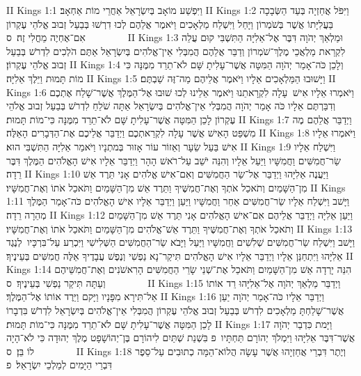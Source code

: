 II Kings 1:1	וַיִּפְשַׁע מוֹאָב בְּיִשְׂרָאֵל אַחֲרֵי מוֹת אַחְאָב׃
II Kings 1:2	וַיִּפֹּל אֲחַזְיָה בְּעַד הַשְּׂבָכָה בַּעֲלִיָּתוֹ אֲשֶׁר בְּשֹׁמְרוֹן וַיָּחַל וַיִּשְׁלַח מַלְאָכִים וַיֹּאמֶר אֲלֵהֶם לְכוּ דִרְשׁוּ בְּבַעַל זְבוּב אֱלֹהֵי עֶקְרוֹן אִם־אֶחְיֶה מֵחֳלִי זֶה׃ {ס}        
II Kings 1:3	וּמַלְאַךְ יְהֹוָה דִּבֶּר אֶל־אֵלִיָּה הַתִּשְׁבִּי קוּם עֲלֵה לִקְרַאת מַלְאֲכֵי מֶלֶךְ־שֹׁמְרוֹן וְדַבֵּר אֲלֵהֶם הֲמִבְּלִי אֵין־אֱלֹהִים בְּיִשְׂרָאֵל אַתֶּם הֹלְכִים לִדְרֹשׁ בְּבַעַל זְבוּב אֱלֹהֵי עֶקְרוֹן׃
II Kings 1:4	וְלָכֵן כֹּה־אָמַר יְהֹוָה הַמִּטָּה אֲשֶׁר־עָלִיתָ שָּׁם לֹא־תֵרֵד מִמֶּנָּה כִּי מוֹת תָּמוּת וַיֵּלֶךְ אֵלִיָּה׃
II Kings 1:5	וַיָּשׁוּבוּ הַמַּלְאָכִים אֵלָיו וַיֹּאמֶר אֲלֵיהֶם מַה־זֶּה שַׁבְתֶּם׃
II Kings 1:6	וַיֹּאמְרוּ אֵלָיו אִישׁ  עָלָה לִקְרָאתֵנוּ וַיֹּאמֶר אֵלֵינוּ לְכוּ שׁוּבוּ אֶל־הַמֶּלֶךְ אֲשֶׁר־שָׁלַח אֶתְכֶם וְדִבַּרְתֶּם אֵלָיו כֹּה אָמַר יְהֹוָה הֲמִבְּלִי אֵין־אֱלֹהִים בְּיִשְׂרָאֵל אַתָּה שֹׁלֵחַ לִדְרֹשׁ בְּבַעַל זְבוּב אֱלֹהֵי עֶקְרוֹן לָכֵן הַמִּטָּה אֲשֶׁר־עָלִיתָ שָּׁם לֹא־תֵרֵד מִמֶּנָּה כִּי־מוֹת תָּמוּת׃
II Kings 1:7	וַיְדַבֵּר אֲלֵהֶם מֶה מִשְׁפַּט הָאִישׁ אֲשֶׁר עָלָה לִקְרַאתְכֶם וַיְדַבֵּר אֲלֵיכֶם אֶת־הַדְּבָרִים הָאֵלֶּה׃
II Kings 1:8	וַיֹּאמְרוּ אֵלָיו אִישׁ בַּעַל שֵׂעָר וְאֵזוֹר עוֹר אָזוּר בְּמתְנָיו וַיֹּאמַר אֵלִיָּה הַתִּשְׁבִּי הוּא׃
II Kings 1:9	וַיִּשְׁלַח אֵלָיו שַׂר־חֲמִשִּׁים וַחֲמִשָּׁיו וַיַּעַל אֵלָיו וְהִנֵּה יֹשֵׁב עַל־רֹאשׁ הָהָר וַיְדַבֵּר אֵלָיו אִישׁ הָאֱלֹהִים הַמֶּלֶךְ דִּבֶּר רֵדָה׃
II Kings 1:10	וַיַּעֲנֶה אֵלִיָּהוּ וַיְדַבֵּר אֶל־שַׂר הַחֲמִשִּׁים וְאִם־אִישׁ אֱלֹהִים אָנִי תֵּרֶד אֵשׁ מִן־הַשָּׁמַיִם וְתֹאכַל אֹתְךָ וְאֶת־חֲמִשֶּׁיךָ וַתֵּרֶד אֵשׁ מִן־הַשָּׁמַיִם וַתֹּאכַל אֹתוֹ וְאֶת־חֲמִשָּׁיו׃
II Kings 1:11	וַיָּשׁב וַיִּשְׁלַח אֵלָיו שַׂר־חֲמִשִּׁים אַחֵר וַחֲמִשָּׁיו וַיַּעַן וַיְדַבֵּר אֵלָיו אִישׁ הָאֱלֹהִים כֹּה־אָמַר הַמֶּלֶךְ מְהֵרָה רֵדָה׃
II Kings 1:12	וַיַּעַן אֵלִיָּה וַיְדַבֵּר אֲלֵיהֶם אִם־אִישׁ הָאֱלֹהִים אָנִי תֵּרֶד אֵשׁ מִן־הַשָּׁמַיִם וְתֹאכַל אֹתְךָ וְאֶת־חֲמִשֶּׁיךָ וַתֵּרֶד אֵשׁ־אֱלֹהִים מִן־הַשָּׁמַיִם וַתֹּאכַל אֹתוֹ וְאֶת־חֲמִשָּׁיו׃
II Kings 1:13	וַיָּשׁב וַיִּשְׁלַח שַׂר־חֲמִשִּׁים שְׁלִשִׁים וַחֲמִשָּׁיו וַיַּעַל וַיָּבֹא שַׂר־הַחֲמִשִּׁים הַשְּׁלִישִׁי וַיִּכְרַע עַל־בִּרְכָּיו  לְנֶגֶד אֵלִיָּהוּ וַיִּתְחַנֵּן אֵלָיו וַיְדַבֵּר אֵלָיו אִישׁ הָאֱלֹהִים תִּיקַר־נָא נַפְשִׁי וְנֶפֶשׁ עֲבָדֶיךָ אֵלֶּה חֲמִשִּׁים בְּעֵינֶיךָ׃
II Kings 1:14	הִנֵּה יָרְדָה אֵשׁ מִן־הַשָּׁמַיִם וַתֹּאכַל אֶת־שְׁנֵי שָׂרֵי הַחֲמִשִּׁים הָרִאשֹׁנִים וְאֶת־חֲמִשֵּׁיהֶם וְעַתָּה תִּיקַר נַפְשִׁי בְּעֵינֶיךָ׃ {ס}        
II Kings 1:15	וַיְדַבֵּר מַלְאַךְ יְהֹוָה אֶל־אֵלִיָּהוּ רֵד אוֹתוֹ אַל־תִּירָא מִפָּנָיו וַיָּקם וַיֵּרֶד אוֹתוֹ אֶל־הַמֶּלֶךְ׃
II Kings 1:16	וַיְדַבֵּר אֵלָיו כֹּה־אָמַר יְהֹוָה יַעַן אֲשֶׁר־שָׁלַחְתָּ מַלְאָכִים לִדְרֹשׁ בְּבַעַל זְבוּב אֱלֹהֵי עֶקְרוֹן הֲמִבְּלִי אֵין־אֱלֹהִים בְּיִשְׂרָאֵל לִדְרֹשׁ בִּדְבָרוֹ לָכֵן הַמִּטָּה אֲשֶׁר־עָלִיתָ שָּׁם לֹא־תֵרֵד מִמֶּנָּה כִּי־מוֹת תָּמוּת׃
II Kings 1:17	וַיָּמת כִּדְבַר יְהֹוָה  אֲשֶׁר־דִּבֶּר אֵלִיָּהוּ וַיִּמְלֹךְ יְהוֹרָם תַּחְתָּיו {פ} בִּשְׁנַת שְׁתַּיִם לִיהוֹרָם בֶּן־יְהוֹשָׁפָט מֶלֶךְ יְהוּדָה כִּי לֹא־הָיָה לוֹ בֵּן׃ {ס}        
II Kings 1:18	וְיֶתֶר דִּבְרֵי אֲחַזְיָהוּ אֲשֶׁר עָשָׂה הֲלוֹא־הֵמָּה כְתוּבִים עַל־סֵפֶר דִּבְרֵי הַיָּמִים לְמַלְכֵי יִשְׂרָאֵל׃ {פ}
